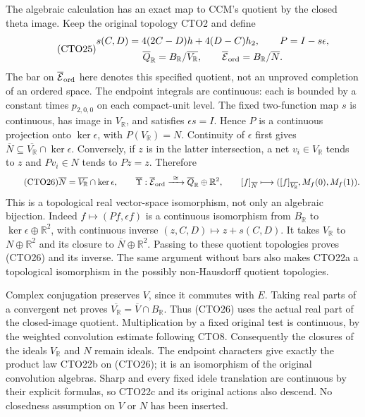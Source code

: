 The algebraic calculation has an exact map to CCM's quotient by the
closed theta image. Keep the original topology CTO2 and define
\begin{equation}\tag{CTO25}
\begin{gathered}
s(C,D)=4(2C-D)h+4(D-C)h_2,\qquad P=I-s\epsilon,\\
\overline Q_{\mathbb R}=B_{\mathbb R}/\overline{V_{\mathbb R}},\qquad
\overline{\mathcal E}_{\rm ord}=B_{\mathbb R}/\overline N.
\end{gathered}
\end{equation}
The bar on $\overline{\mathcal E}_{\rm ord}$ here denotes this
specified quotient, not an unproved completion of an ordered space.
The endpoint integrals are continuous: each is bounded by a constant
times $p_{2,0,0}$ on each compact-unit level. The fixed two-function
map $s$ is continuous, has image in $V_{\mathbb R}$, and satisfies
$\epsilon s=I$. Hence $P$ is a continuous projection onto
$\ker\epsilon$, with $P(V_{\mathbb R})=N$.
Continuity of $\epsilon$ first gives
$\overline N\subseteq\overline{V_{\mathbb R}}\cap\ker\epsilon$.
Conversely, if $z$ is in the latter intersection, a net $v_i\in
V_{\mathbb R}$ tends to $z$ and $Pv_i\in N$ tends to $Pz=z$.
Therefore
\begin{equation}\tag{CTO26}
\overline N=\overline{V_{\mathbb R}}\cap\ker\epsilon,\qquad
\overline\Upsilon:\overline{\mathcal E}_{\rm ord}
\xrightarrow{\ \cong\ }
\overline Q_{\mathbb R}\oplus\mathbb R^2,\qquad
[f]_{\overline N}\longmapsto
([f]_{\overline{V_{\mathbb R}}},M_f(0),M_f(1)).
\end{equation}
This is a topological real vector-space isomorphism, not only an
algebraic bijection. Indeed $f\mapsto(Pf,\epsilon f)$ is a
continuous isomorphism from $B_{\mathbb R}$ to
$\ker\epsilon\oplus\mathbb R^2$, with continuous inverse
$(z,C,D)\mapsto z+s(C,D)$. It takes $V_{\mathbb R}$ to
$N\oplus\mathbb R^2$ and its closure to
$\overline N\oplus\mathbb R^2$. Passing to these quotient
topologies proves (CTO26) and its inverse. The same argument
without bars also makes CTO22a a topological isomorphism in the
possibly non-Hausdorff quotient topologies.

Complex conjugation preserves $V$, since it commutes with $E$.
Taking real parts of a convergent net proves
$\overline{V_{\mathbb R}}=\overline V\cap B_{\mathbb R}$.
Thus (CTO26) uses the actual real part of the closed-image quotient.
Multiplication by a fixed original test is continuous, by the
weighted convolution estimate following CTO8. Consequently the
closures of the ideals $V_{\mathbb R}$ and $N$ remain ideals.
The endpoint characters give exactly the product law CTO22b on
(CTO26); it is an isomorphism of the original convolution algebras.
Sharp and every fixed idele translation are continuous by their
explicit formulas, so CTO22c and its original actions also descend.
No closedness assumption on $V$ or $N$ has been inserted.

